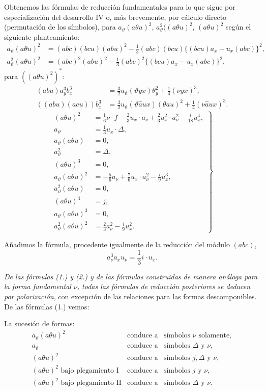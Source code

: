 \documentclass[11pt]{article}
\newcommand{\A}{\Delta}
\begin{document}
Obtenemos las fórmulas de reducción fundamentales para lo que sigue por especialización del desarrollo IV o, más brevemente, por cálculo directo (permutación de los símbolos), para $a_\vartheta(a\theta u)^2$, $a_\vartheta^2((a\theta u)^2$, $(a\theta u)^2$ según el siguiente planteamiento:
\[
\begin{aligned}
a_\vartheta(a\theta u)^2
&=(abc)(bcu)(abu)^2-\frac13(abc)(bcu)\{(bcu)a_x-u_x(abc)\}^2,\\
a_\vartheta^2(a\theta u)^2
&=(abc)^2(abu)^2-\frac13(abc)^2\{(bcu)a_x-u_x(abc)\}^2,
\end{aligned}
\]
para $((a\theta u)^2)^{*}$:
\[
\begin{aligned}
(abu)a_y^3b_x^3&=\frac32u_\vartheta(\vartheta yx)\theta_y^2+\frac14(\nu yx)^3,\\
((abu)(acu))b_x^3&=\frac32u_\vartheta(\vartheta\widehat{a}ux)(\theta au)^2+\frac14(\nu\widehat{a}ux)^3.
\end{aligned}
\]
\[
\left.
\begin{aligned}
(a\theta u)^2&=\frac16\nu\cdot f-\frac23u_x\cdot a_\nu
+\frac23u_x^2\cdot a_\nu^2-\frac{i}{18}u_x^4,\\
a_\vartheta&=\frac13u_x\cdot\A,\\
a_\vartheta(a\theta u)&=0,\\
a_\vartheta^2&=\A,\\
(a\theta u)^3&=0,\\
a_\vartheta(a\theta u)^2&=-\frac56a_\nu+\frac76u_x\cdot a_\nu^2-\frac{i}{9}u_x^3,\\
a_\vartheta^2(a\theta u)&=0,\\
(a\theta u)^4&=j,\\
a_\vartheta(a\theta u)^3&=0,\\
a_\vartheta^2(a\theta u)^2&=\frac23a_\nu^2-\frac{i}{9}u_x^2.
\end{aligned}
\right\} \tag{1}
\]

Añadimos la fórmula, procedente igualmente de la reducción del módulo $(abc)$,
\[
a_\nu^3a_xu_\nu=\frac13 i\cdot u_x. \tag{2}
\]

\emph{De las fórmulas (1.) y (2.) y de las fórmulas construidas de manera análoga para la forma fundamental $\nu$, todas las fórmulas de reducción posteriores se deducen por polarización}, con excepción de las relaciones para las formas descomponibles. De las fórmulas (1.) vemos:

La sucesión de formas:
\[
\begin{array}{rcl}
a_\vartheta(a\theta u)^2 &\text{conduce a}& \text{símbolos }\nu\text{ solamente},\\[0.2em]
a_\vartheta &\text{conduce a}& \text{símbolos }\A\text{ y }\nu,\\[0.2em]
(a\theta u)^2 &\text{conduce a}& \text{símbolos }j,\A\text{ y }\nu,\\[0.2em]
(a\theta u)^2\text{ bajo plegamiento I} &\text{conduce a}& \text{símbolos }j\text{ y }\nu,\\[0.2em]
(a\theta u)^2\text{ bajo plegamiento II} &\text{conduce a}& \text{símbolos }\A\text{ y }\nu.
\end{array}
\]
\end{document}
